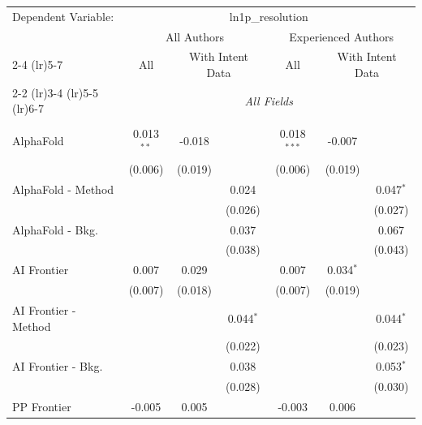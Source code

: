 \begingroup
\centering
\begin{tabular}{lcccccc}
   \tabularnewline \midrule \midrule
   Dependent Variable: & \multicolumn{6}{c}{ln1p\_resolution}\\
 & \multicolumn{3}{c}{All Authors} & \multicolumn{3}{c}{Experienced Authors} \\
\cmidrule(lr){2-4} \cmidrule(lr){5-7}
 & \multicolumn{1}{c}{All} & \multicolumn{2}{c}{With Intent Data} & \multicolumn{1}{c}{All} & \multicolumn{2}{c}{With Intent Data} \\
\cmidrule(lr){2-2} \cmidrule(lr){3-4} \cmidrule(lr){5-5} \cmidrule(lr){6-7}
 & \multicolumn{6}{c}{\textit{All Fields}} \\ \\
   AlphaFold            & 0.013$^{**}$ & -0.018  &             & 0.018$^{***}$ & -0.007      &   \\   
                        & (0.006)      & (0.019) &             & (0.006)       & (0.019)     &   \\   
   AlphaFold - Method   &              &         & 0.024       &               &             & 0.047$^{*}$\\   
                        &              &         & (0.026)     &               &             & (0.027)\\   
   AlphaFold - Bkg.     &              &         & 0.037       &               &             & 0.067\\   
                        &              &         & (0.038)     &               &             & (0.043)\\   
   AI Frontier          & 0.007        & 0.029   &             & 0.007         & 0.034$^{*}$ &   \\   
                        & (0.007)      & (0.018) &             & (0.007)       & (0.019)     &   \\   
   AI Frontier - Method &              &         & 0.044$^{*}$ &               &             & 0.044$^{*}$\\   
                        &              &         & (0.022)     &               &             & (0.023)\\   
   AI Frontier - Bkg.   &              &         & 0.038       &               &             & 0.053$^{*}$\\   
                        &              &         & (0.028)     &               &             & (0.030)\\   
   PP Frontier          & -0.005       & 0.005   &             & -0.003        & 0.006       &   \\   

\end{tabular}
